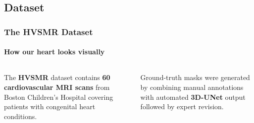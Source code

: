 \documentclass[nometaot,lecture,amberg,toc=twocolumn,indicatelastpageofframe,footlinebox]{OTHAWbeamer}
\begin{document}
\subsection{Dataset}
\begin{frame}[label=current]
    \frametitle{The HVSMR Dataset}
    \framesubtitle{How our heart looks visually }

    \begin{columns}[c]
            The \textcolor{orange1}{\textbf{HVSMR}} dataset contains
            \textbf{60 cardiovascular MRI scans} from Boston Children's
            Hospital covering patients with congenital heart conditions.


            \vspace{0.6em}

            Ground-truth masks were generated by combining manual
            annotations with automated \textbf{3D-UNet} output followed by
            expert revision.

            \centering
    \end{columns}

\end{frame}

\end{document}
